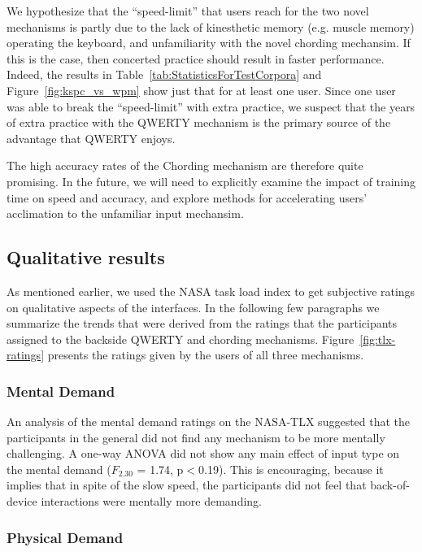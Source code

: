 We hypothesize that the ``speed-limit'' that users reach for the two
novel mechanisms is partly due to the lack of kinesthetic memory
(e.g. muscle memory) operating the keyboard, and unfamiliarity with
the novel chording mechansim.  If this is the case, then concerted
practice should result in faster performance.  Indeed, the results in
Table~\ref{tab:StatisticsForTestCorpora} and
Figure~\ref{fig:kspc_vs_wpm} show just that for at least one user.
Since one user was able to break the ``speed-limit'' with extra
practice, we suspect that the years of extra practice with the QWERTY
mechanism is the primary source of the advantage that QWERTY enjoys.

The high accuracy rates of the Chording mechanism are therefore quite
promising.  In the future, we will need to explicitly examine the
impact of training time on speed and accuracy, and explore methods for
accelerating users' acclimation to the unfamiliar input mechansim.

\subsection{Qualitative results}

As mentioned earlier, we used the NASA task load index to get
subjective ratings on qualitative aspects of the interfaces. In the
following few paragraphs we summarize the trends that were derived
from the ratings that the participants assigned to the backside QWERTY
and chording mechanisms. Figure~\ref{fig:tlx-ratings} presents the
ratings given by the users of all three mechanisms.

\subsubsection{Mental Demand}

An analysis of the mental demand ratings on the NASA-TLX suggested that the participants in the general did not find any mechanism to be more mentally challenging. A one-way ANOVA did not show any main effect of input type on the mental demand ($F_{2.30}$ = 1.74, p$<$0.19). This is encouraging, because it implies that in spite of the slow speed, the participants did not feel that back-of-device interactions were mentally more demanding.

\subsubsection{Physical Demand}

